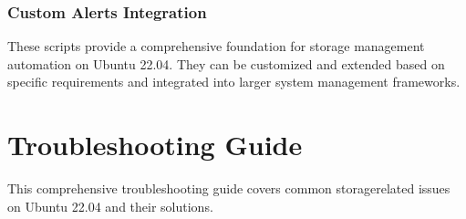 \documentclass[letterpaper,10pt,english]{sphinxmanual}
\begin{document}
\subsection{Custom Alerts Integration}
\label{\detokenize{coding-examples:custom-alerts-integration}}
\begin{sphinxVerbatim}[commandchars=\\\{\}]
 

 
      
    \PYG{p}{[}\PYG{p}{]}  
    \PYG{p}{[}\PYG{p}{]}  
    \PYG{p}{[}\PYG{p}{]}  

      
\end{sphinxVerbatim}

\sphinxAtStartPar
These scripts provide a comprehensive foundation for storage management automation on Ubuntu 22.04. They can be customized and extended based on specific requirements and integrated into larger system management frameworks.

\sphinxstepscope


\chapter{Troubleshooting Guide}
\label{\detokenize{troubleshooting:troubleshooting-guide}}\label{\detokenize{troubleshooting::doc}}
\sphinxAtStartPar
This comprehensive troubleshooting guide covers common storage\sphinxhyphen{}related issues on Ubuntu 22.04 and their solutions.
\end{document}
